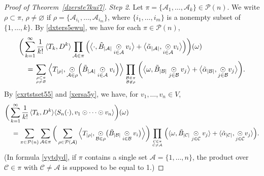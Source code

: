 \documentclass[12pt]{article}
\theoremstyle{remark}
\theoremstyle{remark}
\theoremstyle{remark}
\begin{document}
\begin{proof}[Proof of Theorem~\ref{dzerste7kui7}]
{\it Step 2}. Let $\pi=\{\mathcal A_1,\dots,\mathcal A_k\}\in\mathcal P(n)$. We write $\rho\subset\pi$, $\rho\ne\varnothing$ if $\rho=\{\mathcal A_{i_1},\dots,\mathcal A_{i_m}\}$, where $\{i_1,\dots,i_m\}$ is a nonempty subset of $\{1,\dots,k\}$. By \eqref{dxters5ewu}, we have for each $\pi\in\mathcal P(n)$,
\begin{align}
&\bigg(\sum_{k=1}^\infty \frac 1{k!}\,\langle T_k, D^{k}\rangle \prod_{\mathcal A\in\pi}\Big(
\big\langle \cdot,\tilde B_{|\mathcal A|}\underset{i\in \mathcal A}\odot v_i\big\rangle+\big\langle \tilde\alpha_{|\mathcal A|},\underset{i\in \mathcal A}\odot v_i\big\rangle\Big)\bigg)(\omega)\notag\\
&\quad=\sum_{\rho\subset\pi\atop \rho\ne\varnothing}\Big\langle T_{|\rho|},
\underset{\mathcal A\in\rho}\odot\Big(\tilde B_{|\mathcal A|} \underset{i\in\mathcal A}\odot v_i\Big)\Big\rangle
\prod_{\mathcal B\in\pi\atop\mathcal B\not\in \rho}
\bigg(
\big\langle \omega,\tilde B_{|\mathcal B|}\underset{j\in \mathcal B}\odot v_j\big\rangle+\big\langle \tilde\alpha_{|\mathcal B|},\underset{j\in \mathcal B}\odot v_j\big\rangle\bigg).\label{xersa5y}
\end{align}
By \eqref{cxrtstset55} and \eqref{xersa5y}, we have, for  $v_1,\dots,v_n\in V$,
\begin{align}
&\bigg(\sum_{k=1}^\infty \frac 1{k!}\,\langle T_k, D^{k}\rangle\langle S_n(\cdot),v_1\odot\dots\odot v_n\rangle\bigg)(\omega)\notag\\ 
&\quad=\sum_{\pi\in\mathcal P(n)}\sum_{\mathcal A\in\pi}
\bigg(\sum_{\rho\in\mathcal P(\mathcal A)}\Big\langle T_{|\rho|},\underset{\mathcal B\in\rho}{\odot}\big(\tilde B_{|\mathcal B|}\underset{i\in\mathcal B}\odot v_i\big)\Big\rangle \bigg)
\prod_{{\mathcal C\in\pi}\atop{\mathcal C\ne\mathcal A}}\Big(\langle\omega,\tilde B_{|\mathcal C|}\underset{j\in\mathcal C}\odot v_j \rangle+\langle\tilde\alpha_{|\mathcal C|},
\underset{j\in\mathcal C}\odot v_j\rangle\Big).\label{vytdyd}
\end{align}
(In  formula \eqref{vytdyd}, if $\pi$ contains a single set $\mathcal A=\{1,\dots,n\}$, the product over $\mathcal C\in\pi$ with $\mathcal C\ne\mathcal A$ is supposed to be equal to 1.)


\end{proof}
\end{document}
